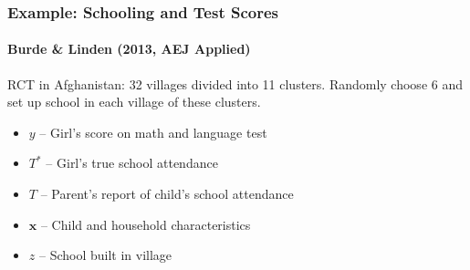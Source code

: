 \documentclass{beamer}
\begin{document}
\begin{frame}
  \frametitle{Example: Schooling and Test Scores}
\framesubtitle{Burde \& Linden (2013, AEJ Applied)}
  RCT in Afghanistan: 32 villages divided into 11 clusters. Randomly choose 6 and set up school in each village of these clusters.

\begin{itemize}
  \item $y$ -- Girl's score on math and language test 
  \item $T^*$ -- Girl's true school attendance
  \item $T$ -- Parent's report of child's school attendance
  \item $\mathbf{x}$ -- Child and household characteristics
  \item $z$ -- School built in village
\end{itemize}
\end{frame}
%
%   
\end{document}
